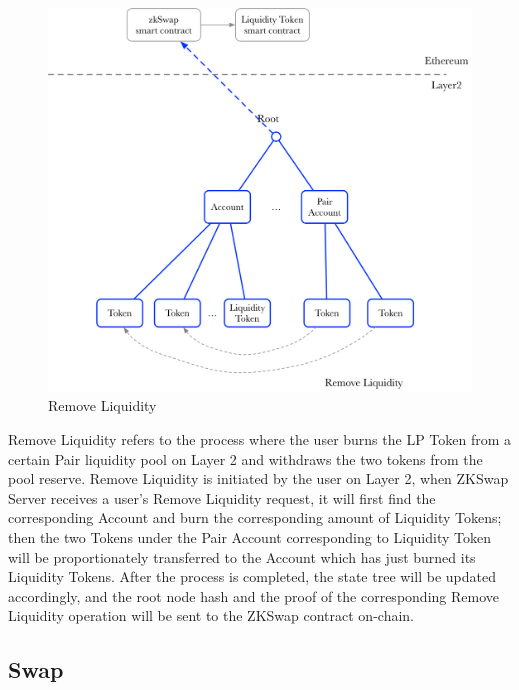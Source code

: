 \documentclass[]{template/llncs}
\begin{document}
\begin{figure}[htbp]
\centering
\includegraphics[width=0.9\columnwidth]{figure/remove_liquidity}
\caption{Remove Liquidity}
\label{fig:remove_liquidity}
\end{figure}

Remove Liquidity refers to the process where the user burns the LP Token from a certain Pair liquidity pool on Layer 2 and withdraws the two tokens from the pool reserve. Remove Liquidity is initiated by the user on Layer 2, when ZKSwap Server receives a user’s Remove Liquidity request, it will first find the corresponding Account and burn the corresponding amount of Liquidity Tokens; then the two Tokens under the Pair Account corresponding to Liquidity Token will be proportionately transferred to the Account which has just burned its Liquidity Tokens. After the process is completed, the state tree will be updated accordingly, and the root node hash and the proof of the corresponding Remove Liquidity operation will be sent to the ZKSwap contract on-chain.

\pagebreak


\subsection{Swap }
\end{document}
